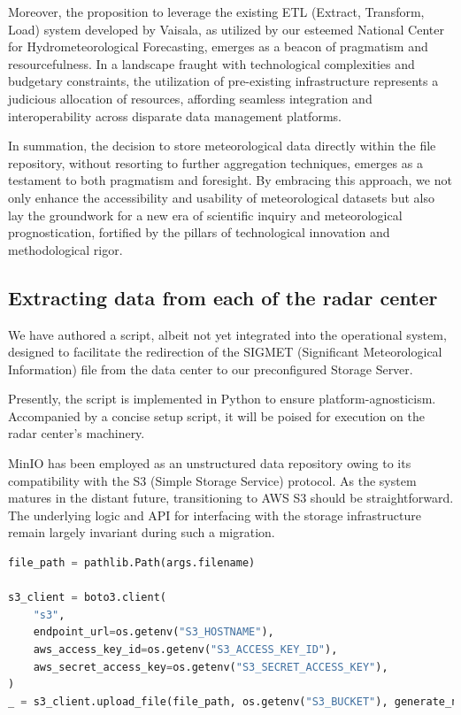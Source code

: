 Moreover, the proposition to leverage the existing ETL (Extract, Transform,
Load) system developed by Vaisala, as utilized by our esteemed National Center
for Hydrometeorological Forecasting, emerges as a beacon of pragmatism and
resourcefulness. In a landscape fraught with technological complexities and
budgetary constraints, the utilization of pre-existing infrastructure represents
a judicious allocation of resources, affording seamless integration and
interoperability across disparate data management platforms.

In summation, the decision to store meteorological data directly within the file
repository, without resorting to further aggregation techniques, emerges as a
testament to both pragmatism and foresight. By embracing this approach, we not
only enhance the accessibility and usability of meteorological datasets but also
lay the groundwork for a new era of scientific inquiry and meteorological
prognostication, fortified by the pillars of technological innovation and
methodological rigor.


\subsection{Extracting data from each of the radar center}
We have authored a script, albeit not yet integrated into the operational
system, designed to facilitate the redirection of the SIGMET (Significant
Meteorological Information) file from the data center to our preconfigured
Storage Server.

Presently, the script is implemented in Python to ensure platform-agnosticism.
Accompanied by a concise setup script, it will be poised for execution on the
radar center's machinery.

MinIO has been employed as an unstructured data repository owing to its
compatibility with the S3 (Simple Storage Service) protocol. As the system
matures in the distant future, transitioning to AWS S3 should be
straightforward. The underlying logic and API for interfacing with the storage
infrastructure remain largely invariant during such a migration.

\begin{lstlisting}[language=Python, caption={Part of the script for uploading data to Storage}]
file_path = pathlib.Path(args.filename)

s3_client = boto3.client(
    "s3",
    endpoint_url=os.getenv("S3_HOSTNAME"),
    aws_access_key_id=os.getenv("S3_ACCESS_KEY_ID"),
    aws_secret_access_key=os.getenv("S3_SECRET_ACCESS_KEY"),
)
_ = s3_client.upload_file(file_path, os.getenv("S3_BUCKET"), generate_new_name(file_path.name))
\end{lstlisting}

